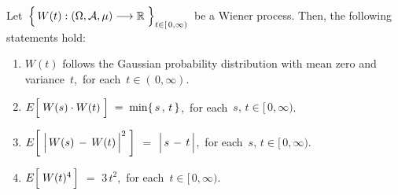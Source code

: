 \vskip 0.5cm
\begin{proposition}
\label{WienerProcessBasicProperties}
\mbox{}
\vskip 0.2cm
\noindent
Let
\,$\left\{\,\overset{{\color{white}.}}{W}(t) : (\Omega,\mathcal{A},\mu) \longrightarrow \Re \;\right\}_{t \in[\,0,\infty)}$\,
be a Wiener process.
Then, the following statements hold:
\begin{enumerate}
\item
	$W(t)$ follows the Gaussian probability distribution with mean zero and variance \,$t$,\,
	for each \,$t \in (\,0,\infty)$.
\item
	$E\!\left[\;\overset{{\color{white}.}}{W(s)} \cdot W(t)\;\right] \; = \; \min\{\,s\,,\,t\,\}$,\,
	for each \,$s,\, t \in [\,0,\infty)$.
\item
	$E\!\left[\;\left\vert\,\overset{{\color{white}.}}{W(s)}\,-\,W(t)\,\right\vert^{2}\;\right]$
	\;$=$\;
	$\left\vert\,s\,\overset{{\color{white}.}}{-}\,t\,\right\vert$,\,
	for each \,$s,\, t \in [\,0,\infty)$.
\item
	$E\!\left[\; W(\overset{{\color{white}.}}{t})^{4} \,\right]$
	\;$=$\;
	$3\,t^{2}$,\,
	for each \,$t \in [\,0,\infty)$.
\end{enumerate}
\end{proposition}
\proof
